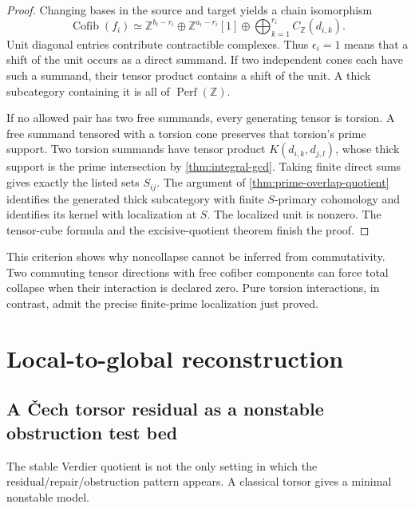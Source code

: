 \documentclass[11pt]{article}
\theoremstyle{definition}
\theoremstyle{remark}
\newcommand{\Cofib}{\operatorname{Cofib}}
\begin{document}
\begin{proof}
Changing bases in the source and target yields a chain isomorphism
\[
 \Cofib(f_i)\simeq
 \mathbb Z^{b_i-r_i}\oplus\mathbb Z^{a_i-r_i}[1]
 \oplus\bigoplus_{k=1}^{r_i}C_{\mathbb Z}(d_{i,k}).
\]
Unit diagonal entries contribute contractible complexes. Thus $\epsilon_i=1$ means that a shift of the unit occurs as a direct summand. If two independent cones each have such a summand, their tensor product contains a shift of the unit. A thick subcategory containing it is all of $\operatorname{Perf}(\mathbb Z)$.

If no allowed pair has two free summands, every generating tensor is torsion. A free summand tensored with a torsion cone preserves that torsion's prime support. Two torsion summands have tensor product $K(d_{i,k},d_{j,l})$, whose thick support is the prime intersection by \cref{thm:integral-gcd}. Taking finite direct sums gives exactly the listed sets $S_{ij}$. The argument of \cref{thm:prime-overlap-quotient} identifies the generated thick subcategory with finite $S$-primary cohomology and identifies its kernel with localization at $S$. The localized unit is nonzero. The tensor-cube formula and the excisive-quotient theorem finish the proof.
\end{proof}

This criterion shows why noncollapse cannot be inferred from commutativity. Two commuting tensor directions with free cofiber components can force total collapse when their interaction is declared zero. Pure torsion interactions, in contrast, admit the precise finite-prime localization just proved.


\section{Local-to-global reconstruction}

\subsection{A \v{C}ech torsor residual as a nonstable obstruction test bed}

The stable Verdier quotient is not the only setting in which the residual/repair/obstruction pattern appears. A classical torsor gives a minimal nonstable model.
\end{document}

